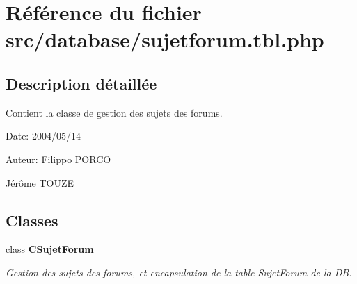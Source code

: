 \section{Référence du fichier src/database/sujetforum.tbl.php}
\label{sujetforum_8tbl_8php}


\subsection{Description détaillée}
Contient la classe de gestion des sujets des forums. 

\begin{Desc}
\item[Date:]2004/05/14\end{Desc}
\begin{Desc}
\item[Auteur:]Filippo PORCO 

Jérôme TOUZE \end{Desc}


\subsection*{Classes}
\begin{CompactItemize}
\item 
class {\bf CSujetForum}
\begin{CompactList}\small\item\em Gestion des sujets des forums, et encapsulation de la table SujetForum de la DB. \item\end{CompactList}\end{CompactItemize}
